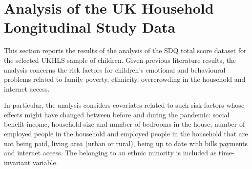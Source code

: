 


\section{Analysis of the UK Household Longitudinal Study Data} \label{sec:SDQ-empirical}

This section reports the results of the analysis of the SDQ total score dataset for the selected UKHLS sample of children. Given previous literature results, the analysis concerns the risk factors for children’s emotional and behavioural problems related to family poverty, ethnicity, overcrowding in the household and internet access. 
\vspace{0.15in}

\noindent In particular, the analysis considers covariates related to such risk factors whose effects might have changed between before and during the pandemic: social benefit income, household size and number of bedrooms in the house, number of employed people in the household and employed people in the household that are not being paid, living area (urban or rural), being up to date with bills payments and internet access.
The belonging to an ethnic minority is included as time-invariant variable.

